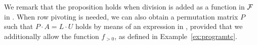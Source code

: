 We remark that the proposition holds when division is added as a function in $\mathcal{F}$
in \langfor. When row pivoting is needed, we can also obtain a permutation matrix
$P$ such that $P\cdot A=L\cdot U$ holds by means of an expression in \langfor, provided
that we additionally allow the function $f_{>0}$, as defined in Example~\ref{ex:programtc}. 

%
%

%


